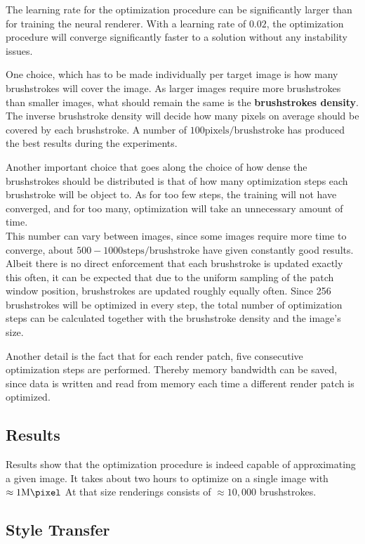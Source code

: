 The learning rate for the optimization procedure can be significantly larger than for training the neural renderer.
With a learning rate of $0.02$, the optimization procedure will converge significantly faster to a solution without any instability issues.

One choice, which has to be made individually per target image is how many brushstrokes will cover the image.
As larger images require more brushstrokes than smaller images, what should remain the same is the \textbf{brushstrokes density}.
The inverse brushstroke density will decide how many pixels on average should be covered by each brushstroke.
A number of $100 \text{pixels}/\text{brushstroke}$ has produced the best results during the experiments.

Another important choice that goes along the choice of how dense the brushstrokes should be distributed is that of how many optimization steps each brushstroke will be object to.
As for too few steps, the training will not have converged, and for too many, optimization will take an unnecessary amount of time.\\
This number can vary between images, since some images require more time to converge, about $500 - 1000 \text{steps}/\text{brushstroke}$ have given constantly good results.\\
Albeit there is no direct enforcement that each brushstroke is updated exactly this often, it can be expected that due to the uniform sampling of the patch window position, brushstrokes are updated roughly equally often.
Since 256 brushstrokes will be optimized in every step, the total number of optimization steps can be calculated together with the brushstroke density and the image's size.

Another detail is the fact that for each render patch, five consecutive optimization steps are performed.
Thereby memory bandwidth can be saved, since data is written and read from memory each time a different render patch is optimized.

\subsection{Results}
Results show that the optimization procedure is indeed capable of approximating a given image.
It takes about two hours to optimize on a single image with $\approx 1 \si{\mega\pixel}$
At that size renderings consists of $\approx 10,000$ brushstrokes.

\subsection{Style Transfer}

